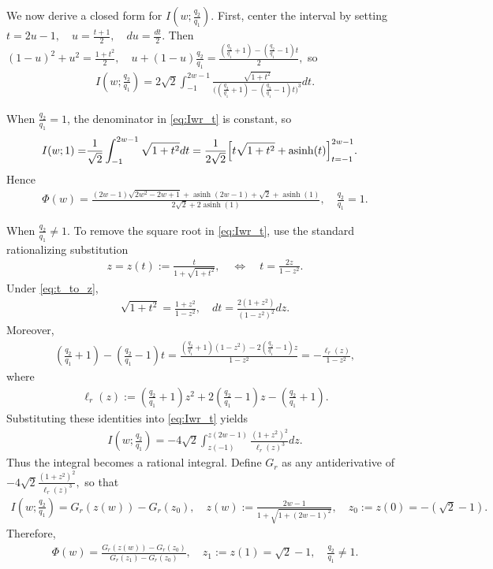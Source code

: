 \documentclass{article}
\newcommand{\Farc}{\Phi}
\begin{document}
We now derive a closed form for $I(w;\tfrac{q_2}{q_1})$. First, center the interval by setting
$
t=2u-1,\quad u=\frac{t+1}{2},\quad du=\frac{dt}{2}.
$
Then
$
(1-u)^2+u^2=\frac{1+t^2}{2},
\quad
u+(1-u)\tfrac{q_2}{q_1}=\frac{(\tfrac{q_2}{q_1}+1)-(\tfrac{q_2}{q_1}-1)t}{2},
$
so
\begin{align}
I(w;\tfrac{q_2}{q_1})
=
2\sqrt2
\int_{-1}^{ 2w-1}
\frac{\sqrt{1+t^2}}{\bigl((\tfrac{q_2}{q_1}+1)-(\tfrac{q_2}{q_1}-1)t\bigr)^3} dt.
\label{eq:Iwr_t}
\end{align}

When $\tfrac{q_2}{q_1}=1$, the denominator in \eqref{eq:Iwr_t} is constant, so
\begin{align}
I(w;1)
= &
\frac{1}{\sqrt2}\int_{-1}^{ 2w-1}\sqrt{1+t^2} dt =
\frac{1}{2\sqrt2}
\Bigl[
t\sqrt{1+t^2}+\operatorname{asinh}(t)
\Bigr]_{t=-1}^{ 2w-1}.
\end{align}
Hence
\begin{align}
\Farc(w)
=
\frac{
(2w-1)\sqrt{2w^2-2w+1}
+\operatorname{asinh}(2w-1)
+\sqrt2+\operatorname{asinh}(1)
}{
2\sqrt2+2\operatorname{asinh}(1)
},
\quad \tfrac{q_2}{q_1}=1.
\label{eq:Farc_r1}
\end{align}

When $\tfrac{q_2}{q_1}\neq 1$.
To remove the square root in \eqref{eq:Iwr_t}, use the standard rationalizing substitution
\begin{align}
z=z(t):=\frac{t}{1+\sqrt{1+t^2}},
\quad\Longleftrightarrow\quad
t=\frac{2z}{1-z^2}.
\label{eq:t_to_z}
\end{align}
Under \eqref{eq:t_to_z},
\begin{align}
\sqrt{1+t^2}=\frac{1+z^2}{1-z^2},
\quad
dt=\frac{2(1+z^2)}{(1-z^2)^2} dz.
\end{align}
Moreover,
\begin{align}
(\tfrac{q_2}{q_1}+1)-(\tfrac{q_2}{q_1}-1)t
=
\frac{(\tfrac{q_2}{q_1}+1)(1-z^2)-2(\tfrac{q_2}{q_1}-1)z}{1-z^2}
=
-\frac{\ell_r(z)}{1-z^2},
\end{align}
where
\begin{align}
\ell_r(z):=(\tfrac{q_2}{q_1}+1)z^2+2(\tfrac{q_2}{q_1}-1)z-(\tfrac{q_2}{q_1}+1).
\label{eq:ellr_def}
\end{align}
Substituting these identities into \eqref{eq:Iwr_t} yields
\begin{align}
I(w;\tfrac{q_2}{q_1})
=
-4\sqrt2
\int_{z(-1)}^{ z(2w-1)}
\frac{(1+z^2)^2}{\ell_r(z)^3} dz.
\label{eq:Iwr_z}
\end{align}
Thus the integral becomes a rational integral. Define $G_r$ as any antiderivative of
$
-4\sqrt2 \frac{(1+z^2)^2}{\ell_r(z)^3},
$
so that
\begin{align}
I(w;\tfrac{q_2}{q_1})=G_r(z(w))-G_r(z_0),
\quad
z(w):=\frac{2w-1}{1+\sqrt{1+(2w-1)^2}},
\quad
z_0:=z(0)=-(\sqrt2-1).
\label{eq:Iwr_Gr}
\end{align}
Therefore,
\begin{align}
\Farc(w)=\frac{G_r(z(w))-G_r(z_0)}{G_r(z_1)-G_r(z_0)},
\quad
z_1:=z(1)=\sqrt2-1,
\quad \tfrac{q_2}{q_1}\neq 1.
\label{eq:Farc_rneq1}
\end{align}
\end{document}
